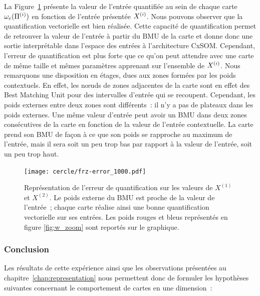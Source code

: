 \documentclass[../main]{subfiles}
\begin{document}
La Figure~\ref{fig:qv} présente la valeur de l'entrée quantifiée au sein de chaque carte $\omega_{e}(\Pi^{({i})})$ en fonction de l'entrée présentée $X^{({i})}$. 
Nous pouvons observer que la quantification vectorielle est bien réalisée. Cette capacité de quantification permet de retrouver la valeur de l'entrée à partir du BMU de la carte et donne donc une sortie interprétable dans l'espace des entrées à l'architecture CxSOM.
Cependant, l'erreur de quantification est plus forte que ce qu'on peut attendre avec une carte de même taille et mêmes paramètres apprenant sur l'ensemble de $X^{({i})}$. Nous remarquons une disposition en étages, dues aux zones formées par les poids contextuels.
En effet, les n\oe{}uds de zones adjacentes de la carte sont en effet des Best Matching Unit pour des intervalles d'entrée qui se recoupent. Cependant, les poids externes entre deux zones sont différents~: il n'y a pas de plateaux dans les poids externes. Une même valeur d'entrée peut avoir un BMU dans deux zones consécutives de la carte en fonction de la valeur de l'entrée contextuelle. La carte prend son BMU de façon à ce que son poids se rapproche au maximum de l'entrée, mais il sera soit un peu trop bas par rapport à la valeur de l'entrée, soit un peu trop haut.

\begin{figure}
	\centering\texttt{[image: cercle/frz-error\_1000.pdf]}
	\caption{Représentation de l'erreur de quantification sur les valeurs de $X^{(1)}$ et $X^{(2)}$. Le poids externe du BMU est proche de la valeur de l'entrée~; chaque carte réalise ainsi une bonne quantification vectorielle sur ses entrées. 
	Les poids rouges et bleus représentés en figure \ref{fig:w_zoom} sont reportés sur le graphique. \label{fig:qv}}
\end{figure}

\subsubsection{Conclusion}

Les résultats de cette expérience ainsi que les observations présentées au chapitre~\ref{chap:representation} nous permettent donc de formuler les hypothèses suivantes concernant le comportement de cartes en une dimension~:
\end{document}
